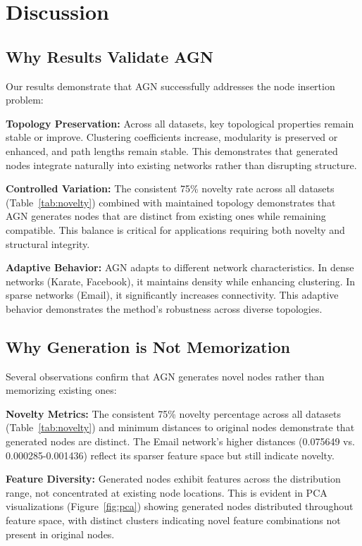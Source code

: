 \documentclass[12pt]{article}
\begin{document}
\section{Discussion}

\subsection{Why Results Validate AGN}

Our results demonstrate that AGN successfully addresses the node insertion problem:

\textbf{Topology Preservation:} Across all datasets, key topological properties remain stable or improve. Clustering coefficients increase, modularity is preserved or enhanced, and path lengths remain stable. This demonstrates that generated nodes integrate naturally into existing networks rather than disrupting structure.

\textbf{Controlled Variation:} The consistent 75\% novelty rate across all datasets (Table~\ref{tab:novelty}) combined with maintained topology demonstrates that AGN generates nodes that are distinct from existing ones while remaining compatible. This balance is critical for applications requiring both novelty and structural integrity.

\textbf{Adaptive Behavior:} AGN adapts to different network characteristics. In dense networks (Karate, Facebook), it maintains density while enhancing clustering. In sparse networks (Email), it significantly increases connectivity. This adaptive behavior demonstrates the method's robustness across diverse topologies.

\subsection{Why Generation is Not Memorization}

Several observations confirm that AGN generates novel nodes rather than memorizing existing ones:

\textbf{Novelty Metrics:} The consistent 75\% novelty percentage across all datasets (Table~\ref{tab:novelty}) and minimum distances to original nodes demonstrate that generated nodes are distinct. The Email network's higher distances (0.075649 vs. 0.000285-0.001436) reflect its sparser feature space but still indicate novelty.

\textbf{Feature Diversity:} Generated nodes exhibit features across the distribution range, not concentrated at existing node locations. This is evident in PCA visualizations (Figure~\ref{fig:pca}) showing generated nodes distributed throughout feature space, with distinct clusters indicating novel feature combinations not present in original nodes.
\end{document}
